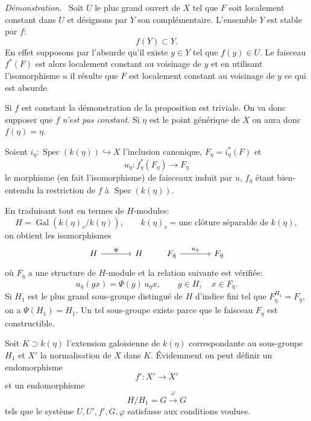 \documentclass[11pt]{article}
\newenvironment{prooftext}[1][Proof]{\par\noindent\emph{#1.}\ }{\par\medskip}
\DeclareMathOperator{\Spec}{Spec}
\providecommand{\Gal}{\operatorname{Gal}}
\providecommand{\Spec}{\operatorname{Spec}}
\providecommand{\Spec}{\operatorname{Spec}}
\providecommand{\Spec}{\operatorname{Spec}}
\providecommand{\Spec}{\operatorname{Spec}}
\providecommand{\Gal}{\operatorname{Gal}}
\begin{document}
\begin{prooftext}[Démonstration]
Soit $U$ le plus grand ouvert de $X$ tel que $F$ soit localement constant dans $U$ et désignons par $Y$ son complémentaire. L'ensemble $Y$ est stable par $f$:
\[
f(Y)\subset Y.
\]
En effet supposons par l'absurde qu'il existe $y\in Y$ tel que $f(y)\in U$. Le faisceau $f^*(F)$ est alors localement constant au voisinage de $y$ et en utilisant l'isomorphisme $u$ il résulte que $F$ est localement constant au voisinage de $y$ ce qui est absurde.

Si $f$ est constant la démonstration de la proposition est triviale. On va donc supposer que $f$ \emph{n'est pas constant}. Si $\eta$ est le point générique de $X$ on aura donc $f(\eta)=\eta$.

Soient $i_\eta:\Spec(k(\eta))\hookrightarrow X$ l'inclusion canonique, $F_\eta=i_\eta^*(F)$ et
\[
u_\eta:f_\eta^*(F_\eta)\longrightarrow F_\eta
\]
le morphisme (en fait l'isomorphisme) de faisceaux induit par $u$, $f_\eta$ étant bien-entendu la restriction de $f$ à $\Spec(k(\eta))$.

En traduisant tout en termes de $H$-modules:
\[
H=\Gal(k(\eta)_s/k(\eta)),\qquad k(\eta)_s=\text{une clôture séparable de }k(\eta),
\]
on obtient les isomorphismes
\[
\begin{tikzcd}[column sep=large]
H \arrow[r,"\Psi"] & H
\end{tikzcd}
\qquad
\begin{tikzcd}[column sep=large]
F_{\bar\eta} \arrow[r,"u_{\bar\eta}"] & F_{\bar\eta}
\end{tikzcd}
\]
où $F_{\bar\eta}$ a une structure de $H$-module et la relation suivante est vérifiée:
\[
u_{\bar\eta}(gx)=\Psi(g)\,u_{\bar\eta} x,
\qquad g\in H,
\quad x\in F_{\bar\eta}.
\]
Si $H_1$ est le plus grand sous-groupe distingué de $H$ d'indice fini tel que $F_{\bar\eta}^{H_1}=F_{\bar\eta}$, on a $\Psi(H_1)=H_1$. Un tel sous-groupe existe parce que le faisceau $F_\eta$ est constructible.

Soit $K\supset k(\eta)$ l'extension galoisienne de $k(\eta)$ correspondante au sous-groupe $H_1$ et $X'$ la normalisation de $X$ dans $K$. Évidemment on peut définir un endomorphisme
\[
f':X'\longrightarrow X'
\]
et un endomorphisme
\[
H/H_1=G\xrightarrow{\varphi}G
\]
tels que le système $U,U',f',G,\varphi$ satisfasse aux conditions voulues.
\end{prooftext}
\end{document}
